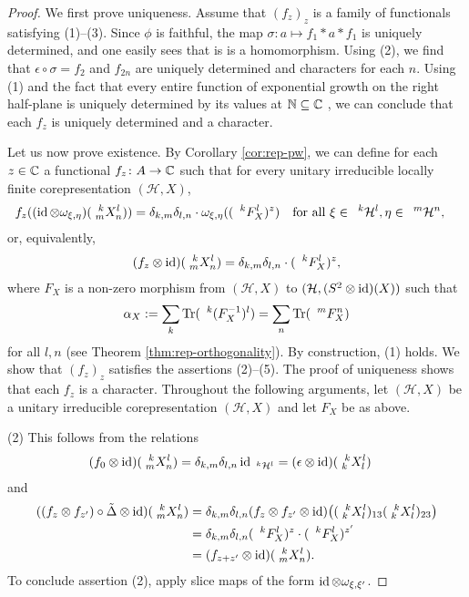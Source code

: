 \begin{proof}
  We first prove uniqueness.  Assume that $(f_{z})_{z}$ is a family of
  functionals satisfying (1)--(3).  Since $\phi$ is faithful, the map
  $\sigma\colon a \mapsto f_{1} \ast a \ast f_{1}$ is uniquely
  determined, and one easily sees that is is a homomorphism. Using
  (2), we find that $\epsilon \circ \sigma=f_{2}$ and $f_{2n}$ are
  uniquely determined and characters for each $n$. Using (1) and the
  fact that every entire function of exponential growth on the right
  half-plane is uniquely determined by its values at $\N \subseteq \C$
  \cite{}, we can conclude that each $f_{z}$ is uniquely determined
  and a character.

  Let us now prove existence.  By Corollary \ref{cor:rep-pw}, we can
  define for each $z\in \C$ a functional $f_{z} \colon A \to \C$ such
  that for every unitary irreducible locally finite corepresentation
  $(\mathcal{H},X)$,
    \begin{align*}
      f_{z}((\id \otimes \omega_{\xi,\eta})(\Gr{X}{k}{l}{m}{n})) &=
      \delta_{k,m}\delta_{l,n} \cdot
      \omega_{\xi,\eta}((\Gru{F_{X}}{k}{l})^{z}) \quad \text{for all }
      \xi \in \Gru{\mathcal{H}}{k}{l},\eta \in
      \Gru{\mathcal{H}}{m}{n},
    \end{align*}
    or, equivalently,
    \begin{align*}
      (f_{z} \otimes \id)(\Gr{X}{k}{l}{m}{n}) =
      \delta_{k,m}\delta_{l,n} \cdot (\Gru{F_{X}}{k}{l})^{z},
    \end{align*}
    where $F_{X}$ is a non-zero morphism from $(\mathcal{H},X)$ to
    $(\mathcal{H}, (S^{2} \otimes \id)(X))$ such that
    \begin{align*}
      \alpha_{X}:= \sum_{k} \Tr(\Gru{(F_{X}^{-1})}{k}{l}) = \sum_{n}
      \Tr(\Gru{F_{X}}{m}{n})
    \end{align*}
    for all $l,n$ (see Theorem \ref{thm:rep-orthogonality}). By
    construction, (1) holds. We show that $(f_{z})_{z}$ satisfies the
    assertions (2)--(5). The proof of uniqueness shows that each
    $f_{z}$ is a character. Throughout the following arguments, let 
    $(\mathcal{H},X)$ be a unitary irreducible corepresentation
    $(\mathcal{H},X)$ and let $F_{X}$ be as above.

    (2) This follows from the relations
    \begin{align*}
      (f_{0}  \otimes \id)(\Gr{X}{k}{l}{m}{n}) &=
      \delta_{k,m}\delta_{l,n} \id_{\Gru{\mathcal{H}}{k}{l}} =
      (\epsilon \otimes \id)(\Gr{X}{k}{l}{k}{l})
    \end{align*}
    and
    \begin{align*}
      ((f_{z}\otimes f_{z'})\circ \tilde \Delta \otimes
      \id)(\Gr{X}{k}{l}{m}{n}) &=  \delta_{k,m}\delta_{l,n}(f_{z} \otimes f_{z'} \otimes
      \id)\big((\Gr{X}{k}{l}{k}{l})_{13}
      (\Gr{X}{k}{l}{k}{l})_{23}\big) \\
      &=  \delta_{k,m}\delta_{l,n}(\Gru{F_{X}}{k}{l})^{z}  \cdot (\Gru{F_{X}}{k}{l})^{z'} \\
      &= (f_{z+z'} \otimes \id)(\Gr{X}{k}{l}{m}{n}).
    \end{align*}
    To conclude assertion (2), apply slice maps of the form $\id
    \otimes \omega_{\xi,\xi'}$.


\end{proof}
